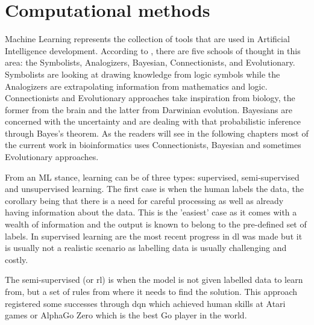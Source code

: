 \section{Computational methods} \label{s:lit:computational}

\vspace{3mm}
\vspace{3mm}

Machine Learning represents the collection of tools that are used in Artificial Intelligence development. According to \citet{Domingos_Pedro2015-xr}, there are five schools of thought in this area: the Symbolists, Analogizers, Bayesian, Connectionists, and Evolutionary. Symbolists are looking at drawing knowledge from logic symbols while the Analogizers are extrapolating information from mathematics and logic\cite{Domingos_Pedro2015-xr}. Connectionists and Evolutionary approaches take inspiration from biology, the former from the brain and the latter from Darwinian evolution. Bayesians are concerned with the uncertainty and are dealing with that probabilistic inference through Bayes's theorem\cite{Domingos_Pedro2015-xr}. As the readers will see in the following chapters most of the current work in bioinformatics uses Connectionists, Bayesian and sometimes Evolutionary approaches.

From an ML stance, learning can be of three types: supervised, semi-supervised and unsupervised learning. The first case is when the human labels the data, the corollary being that there is a need for careful processing as well as already having information about the data. This is the 'easiest' case as it comes with a wealth of information and the output is known to belong to the pre-defined set of labels. In supervised learning are the most recent progress in \acrfull{dl} was made but it is usually not a realistic scenario as labelling data is usually challenging and costly. 

The semi-supervised (or \acrfull{rl}) is when the model is not given labelled data to learn from, but a set of rules from where it needs to find the solution. This approach registered some successes through \acrfull{dqn} which achieved human skills at Atari games\cite{Mnih2015-cw} or AlphaGo Zero\cite{Silver2017-sw} which is the best Go player in the world. 

